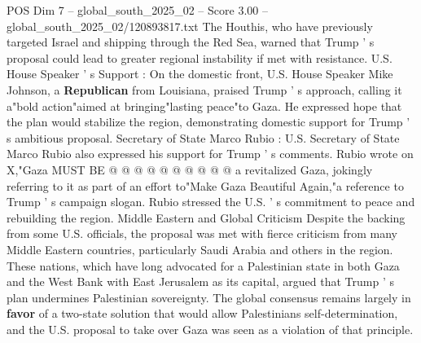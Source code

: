 \begin{textsample}{POS Dim 7 – global\_south\_2025\_02 – Score 3.00 – global\_south\_2025\_02/120893817.txt}
The Houthis, who have previously targeted Israel and shipping through the Red Sea, warned that Trump ' s proposal could lead to greater regional instability if met with resistance.
U.S.
House Speaker ' s Support : On the domestic front, U.S.
House Speaker Mike Johnson, a \textbf{Republican} from Louisiana, praised Trump ' s approach, calling it a"bold action"aimed at bringing"lasting peace"to Gaza.
He expressed hope that the plan would stabilize the region, demonstrating domestic support for Trump ' s ambitious proposal.
Secretary of State Marco Rubio : U.S.
Secretary of State Marco Rubio also expressed his support for Trump ' s comments.
Rubio wrote on X,"Gaza MUST BE @ @ @ @ @ @ @ @ @ @ a revitalized Gaza, jokingly referring to it as part of an effort to"Make Gaza Beautiful Again,"a reference to Trump ' s campaign slogan.
Rubio stressed the U.S. ' s commitment to peace and rebuilding the region.
Middle Eastern and Global Criticism Despite the backing from some U.S. officials, the proposal was met with fierce criticism from many Middle Eastern countries, particularly Saudi Arabia and others in the region.
These nations, which have long advocated for a Palestinian state in both Gaza and the West Bank with East Jerusalem as its capital, argued that Trump ' s plan undermines Palestinian sovereignty.
The global consensus remains largely in \textbf{favor} of a two-state solution that would allow Palestinians self-determination, and the U.S. proposal to take over Gaza was seen as a violation of that principle.

\end{textsample}
